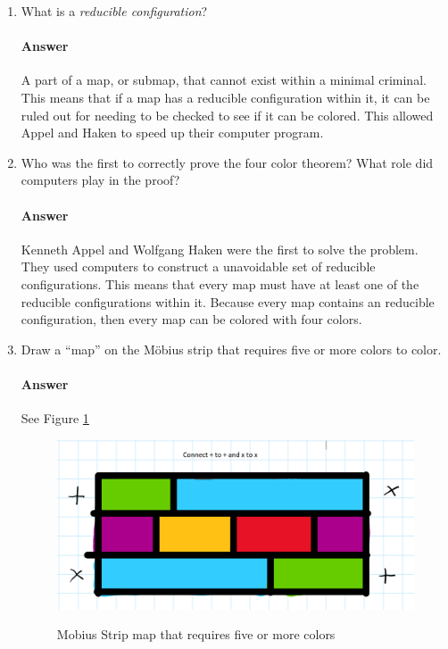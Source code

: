 \documentclass{article}
\begin{document}
\begin{enumerate}
\begin{enumerate}
    \item What is a \emph{reducible configuration}?

        \paragraph{Answer}

        A part of a map, or submap, that cannot exist within a minimal criminal. This means that if a map has a reducible configuration within it, it can be ruled out for needing to be checked to see if it can be colored. This allowed Appel and Haken to speed up their computer program.



    \item Who was the first to correctly prove the four color theorem?  What
        role did computers play in the proof?

        \paragraph{Answer}

        Kenneth Appel and Wolfgang Haken were the first to solve the problem. They used computers to construct a unavoidable set of reducible configurations. 
        This means that every map must have at least one of the reducible configurations within it. Because every map contains an reducible configuration, then every map can be
        colored with four colors.




    \item Draw a ``map'' on the M\"obius strip that requires five or more colors
        to color.

        \paragraph{Answer}
        See Figure \ref{mobius}

        \begin{figure}
\caption{Mobius Strip map that requires five or more colors}
\centering
\includegraphics[width=\textwidth]{images/mobius}
\label{mobius}
\end{figure}



\end{enumerate}
\end{enumerate}
\end{document}

